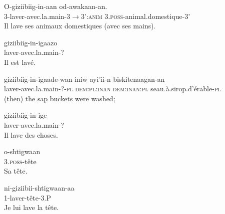 \documentclass[oldfontcommands,twoside,a4paper,12pt]{article}
\begin{document}
\begin{exe}
\ex 
\gll O-giziibiig-in-aan od-awakaan-an. \\ 
3-laver-avec.la.main-3$\rightarrow$3':\textsc{anim} \textsc{3.poss}-animal.domestique-3'
  \\
\glt Il lave ses animaux domestiques (avec ses mains).
\end{exe} 

\begin{exe}
\ex  
\gll giziibiig-in-igaazo \\
laver-avec.la.main-? \\
\glt Il est lavé.
\end{exe}
 \begin{exe}
\ex  
\gll 
giziibiig-in-igaade-wan iniw ayi'ii-n biskitenaagan-an \\
laver-avec.la.main-?-\textsc{pl} \textsc{dem:pl:inan} \textsc{dem:inan:pl} seau.à.sirop.d'érable-\textsc{pl} \\
\glt (then) the sap buckets were washed;
\end{exe}
\begin{exe}
\ex  
\gll giziibiig-in-ige \\
laver-avec.la.main-? \\
\glt Il lave des choses.
\end{exe}

\begin{exe}
\ex  
\gll o-shtigwaan \\
\textsc{3.poss}-tête \\
\glt Sa tête.
\end{exe}

\begin{exe}
\ex  
\gll ni-giziibii-shtigwaan-aa \\
1-laver-tête-3.P \\
\glt Je lui lave la tête.
\end{exe}

 
\end{document}
